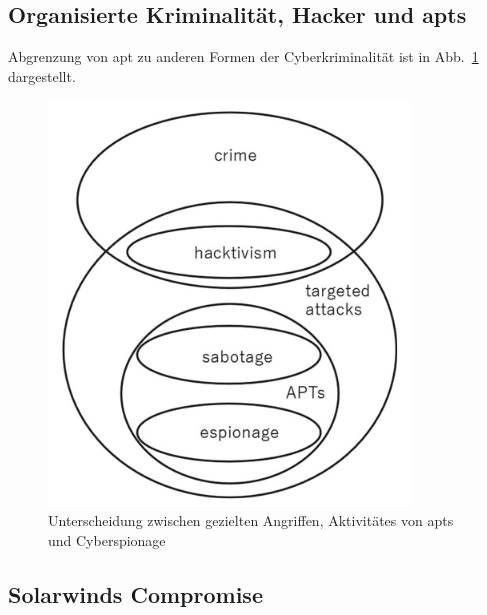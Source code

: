 \documentclass[conference]{IEEEtran}
\begin{document}
\subsection{Organisierte Kriminalität, Hacker und \aclp*{apt}}
Abgrenzung von \ac{apt} zu anderen Formen der Cyberkriminalität ist in Abb.~\ref{fig.destinction} dargestellt.
\begin{figure}[htbp]
    \centerline{\includegraphics[scale=0.8]{figures/Destinction between targeted attacks, activity by APTs, and cyber-espionage.png}}
    \caption{Unterscheidung zwischen gezielten Angriffen, Aktivitätes von \acp{apt} und Cyberspionage \protect\cite[S.~6]{Steffens2020}}
    \label{fig.destinction}
\end{figure}
\subsection{Solarwinds Compromise}
\end{document}
